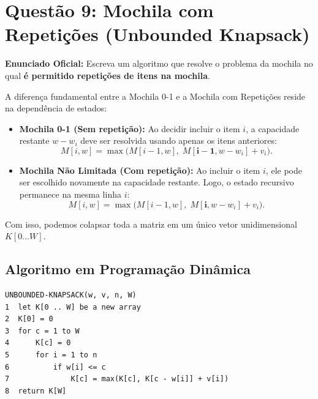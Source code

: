 \documentclass[11pt,a4paper]{article}
\begin{document}
\vspace{0.4cm}

\section*{Questão 9: Mochila com Repetições (Unbounded Knapsack)}

\textbf{Enunciado Oficial:} Escreva um algoritmo que resolve o problema da mochila no qual \textbf{é permitido repetições de itens na mochila}.

\begin{teoria}
A diferença fundamental entre a Mochila 0-1 e a Mochila com Repetições reside na dependência de estados:
\begin{itemize}
    \item \textbf{Mochila 0-1 (Sem repetição):} Ao decidir incluir o item $i$, a capacidade restante $w - w_i$ deve ser resolvida usando apenas os itens anteriores:
    \[
    M[i, w] = \max\Big( M[i-1, w], \; M[\mathbf{i-1}, w - w_i] + v_i \Big).
    \]
    \item \textbf{Mochila Não Limitada (Com repetição):} Ao incluir o item $i$, ele pode ser escolhido novamente na capacidade restante. Logo, o estado recursivo permanece na mesma linha $i$:
    \[
    M[i, w] = \max\Big( M[i-1, w], \; M[\mathbf{i}, w - w_i] + v_i \Big).
    \]
\end{itemize}
Com isso, podemos colapsar toda a matriz em um único vetor unidimensional $K[0 \dots W]$.
\end{teoria}

\subsection*{Algoritmo em Programação Dinâmica}

\begin{lstlisting}[caption={Algoritmo da Mochila com Repetições (Unbounded Knapsack)}]
UNBOUNDED-KNAPSACK(w, v, n, W)
1  let K[0 .. W] be a new array
2  K[0] = 0
3  for c = 1 to W
4      K[c] = 0
5      for i = 1 to n
6          if w[i] <= c
7              K[c] = max(K[c], K[c - w[i]] + v[i])
8  return K[W]
\end{lstlisting}
\end{document}
